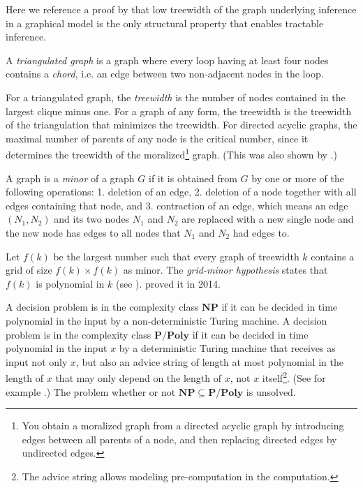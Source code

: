 Here we reference a proof by \cite{ChandrasekaranHarsha2012} that
low treewidth of the graph underlying inference in a graphical model
is the only structural property that enables tractable inference.

A \emph{triangulated graph} is a graph
where every loop having at least four nodes contains a \emph{chord},
i.e. an edge between two non-adjacent nodes in the loop\cite{Barber2012}.

For a triangulated graph, the \emph{treewidth} is
the number of nodes contained in the largest clique minus one. For
a graph of any form, the treewidth is the treewidth of the triangulation
that minimizes the treewidth. For directed acyclic graphs, the maximal
number of parents of any node is the critical number, since it determines
the treewidth of the moralized\footnote{You obtain a moralized graph from a directed acyclic graph by introducing
edges between all parents of a node, and then replacing directed edges
by undirected edges.} graph. (This was also shown by \cite{KwisthoutVanderGaag2010}.)

A graph is a \emph{minor}\emph{ }of a graph
$G$ if it is obtained from $G$ by one or more of the following operations:
1. deletion of an edge, 2. deletion of a node together with all edges
containing that node, and 3. contraction of an edge, which means an
edge $(N_{1},N_{2})$ and its two nodes $N_{1}$ and $N_{2}$ are
replaced with a new single node and the new node has edges to all
nodes that $N_{1}$ and $N_{2}$ had edges to.

Let $f(k)$ be the largest number such that every graph of treewidth
$k$ contains a grid of size $f(k)\times f(k)$ as minor. The \emph{grid-minor
hypothesis} states that $f(k)$ is polynomial
in $k$ (see \cite{ChandrasekaranHarsha2012}). \cite{ChekuriChuzhoy2014}
proved it in 2014.

A decision problem is in the complexity class $\mathbf{NP}$ if it
can be decided in time polynomial in the input by a non-deterministic
Turing machine. A decision problem is in the complexity class $\mathbf{P/Poly}$
if it can be decided in time polynomial in the input $x$ by a deterministic
Turing machine that receives as input not only $x$, but also an advice
string of length at most polynomial in the length of $x$ that may
only depend on the length of $x$, not $x$ itself\footnote{The advice string allows modeling pre-computation in the computation.}.
(See for example \cite{Sipser1996,Goldreich2008,AroraBarak2009}.)
The problem whether or not $\mathbf{NP}\subseteq\mathbf{P/Poly}$
is unsolved. 

